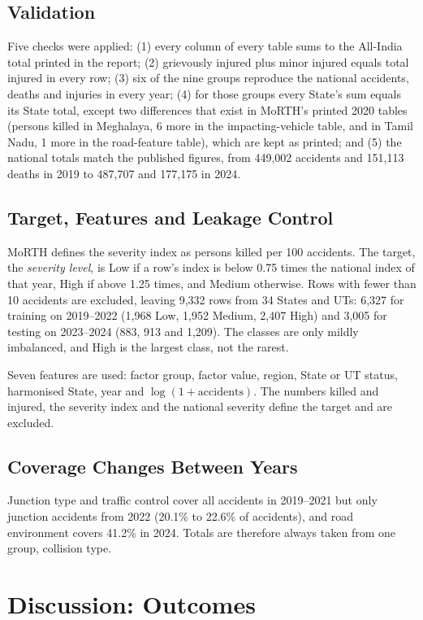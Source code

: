 \documentclass[conference]{IEEEtran}
\begin{document}
\subsection{Validation}
Five checks were applied: (1) every column of every table sums to the All-India total printed in the report; (2) grievously injured plus minor injured equals total injured in every row; (3) six of the nine groups reproduce the national accidents, deaths and injuries in every year; (4) for those groups every State's sum equals its State total, except two differences that exist in MoRTH's printed 2020 tables (persons killed in Meghalaya, 6 more in the impacting-vehicle table, and in Tamil Nadu, 1 more in the road-feature table), which are kept as printed; and (5) the national totals match the published figures, from 449,002 accidents and 151,113 deaths in 2019 to 487,707 and 177,175 in 2024.

\subsection{Target, Features and Leakage Control}
MoRTH defines the severity index as persons killed per 100 accidents. The target, the \emph{severity level}, is Low if a row's index is below 0.75 times the national index of that year, High if above 1.25 times, and Medium otherwise. Rows with fewer than 10 accidents are excluded, leaving 9,332 rows from 34 States and UTs: 6,327 for training on 2019--2022 (1,968 Low, 1,952 Medium, 2,407 High) and 3,005 for testing on 2023--2024 (883, 913 and 1,209). The classes are only mildly imbalanced, and High is the largest class, not the rarest.

Seven features are used: factor group, factor value, region, State or UT status, harmonised State, year and $\log(1+\text{accidents})$. The numbers killed and injured, the severity index and the national severity define the target and are excluded.

\subsection{Coverage Changes Between Years}
Junction type and traffic control cover all accidents in 2019--2021 but only junction accidents from 2022 (20.1\% to 22.6\% of accidents), and road environment covers 41.2\% in 2024. Totals are therefore always taken from one group, collision type.

\section{Discussion: Outcomes}
\label{sec:discussion}
\end{document}
